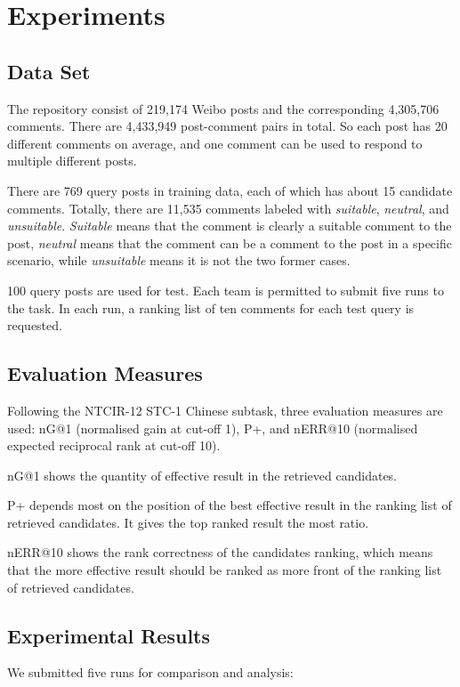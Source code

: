 \documentclass{sig-alternate}
\begin{document}
\section{Experiments}

\subsection{Data Set}
The repository consist of 219,174 Weibo posts and the
corresponding 4,305,706 comments. There are 4,433,949 post-comment
pairs in total. So each post has 20 different comments on
average, and one comment can be used to respond to multiple
different posts. 

There are 769 query posts in training data, each of which has about 15 
candidate comments. Totally, there are 11,535 comments labeled with 
\emph{suitable}, \emph{neutral}, and \emph{unsuitable}. \emph{Suitable} means that the comment 
is clearly a suitable comment to the post, \emph{neutral} means that the comment 
can be a comment to the post in a specific scenario, while \emph{unsuitable} means 
it is not the two former cases. 

100 query posts are used for test. Each team is permitted to submit five
runs to the task. In each run, a ranking list of ten comments for
each test query is requested. 

\subsection{Evaluation Measures}
Following the NTCIR-12 STC-1 Chinese subtask, three evaluation measures are
used: nG@1 (normalised gain at cut-off 1), P+, and nERR@10 (normalised expected reciprocal rank at cut-off 10)\cite{Lifeng}\cite{Lifeng-13}.

nG@1 shows the quantity of effective result in the retrieved candidates. 

P+ depends most on the position of the best effective result in the
ranking list of retrieved candidates. It gives the top ranked result
the most ratio. 

nERR@10 shows the rank correctness of the candidates ranking,
which means that the more effective result should be ranked as
more front of the ranking list of retrieved candidates.

\subsection{Experimental Results}
We submitted five runs for comparison and analysis:
\end{document}
